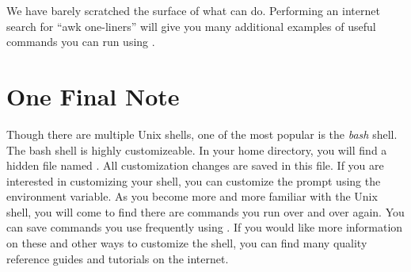 We have barely scratched the surface of what  can do. Performing an internet search for ``awk one-liners'' will give you many additional examples of useful commands you can run using .

\section*{One Final Note}
Though there are multiple Unix shells, one of the most popular is the \emph{bash} shell. The bash shell is highly customizeable. In your home directory, you will find a hidden file named . All customization changes are saved in this file. If you are interested in customizing your shell, you can customize the prompt using the  environment variable.
As you become more and more familiar with the Unix shell, you will come to find there are commands you run over and over again. You can save commands you use frequently using . If you would like more information on these and other ways to customize the shell, you can find many quality reference guides and tutorials on the internet.
